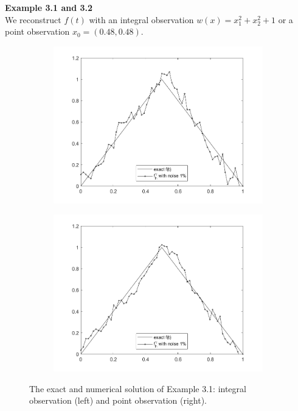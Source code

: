 \documentclass[]{article}
\begin{document}
\newpage
\noindent\textbf{Example 3.1 and 3.2}
\\
We reconstruct $f(t)$ with an integral observation $w(x)=x_1^2+x_2^2+1$ or a point observation $x_0=(0.48, 0.48).$
\begin{figure}[h!]
	\begin{subfigure}{.5\linewidth}
		\centering
		\includegraphics[width=\linewidth]{../Csharp/Results/HS_Integration_ft1}
	\end{subfigure}%
	\begin{subfigure}{.5\linewidth}
		\centering
		\includegraphics[width=\linewidth]{../Csharp/Results/HS_1Point_ft1}
	\end{subfigure}
	\caption{The exact and numerical solution of Example 3.1: integral observation (left) and point observation (right).}
\end{figure}
\end{document}
